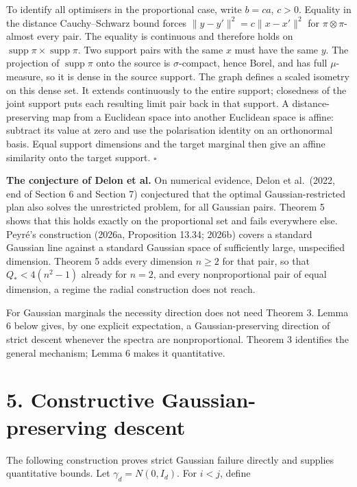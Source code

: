 \documentclass[
  british,
  11pt,
  a4paper,
]{article}
\begin{document}
To identify all optimisers in the proportional case, write \(b=c a\),
\(c>0\). Equality in the distance Cauchy--Schwarz bound forces
\(\|y-y'\|^2=c\|x-x'\|^2\) for \(\pi\otimes\pi\)-almost every pair. The
equality is continuous and therefore holds on
\(\operatorname{supp}\pi\times\operatorname{supp}\pi\). Two support
pairs with the same \(x\) must have the same \(y\). The projection of
\(\operatorname{supp}\pi\) onto the source is \(\sigma\)-compact, hence
Borel, and has full \(\mu\)-measure, so it is dense in the source
support. The graph defines a scaled isometry on this dense set. It
extends continuously to the entire support; closedness of the joint
support puts each resulting limit pair back in that support. A
distance-preserving map from a Euclidean space into another Euclidean
space is affine: subtract its value at zero and use the polarisation
identity on an orthonormal basis. Equal support dimensions and the
target marginal then give an affine similarity onto the target support.
\(\square\)

\textbf{The conjecture of Delon et al.} On numerical evidence, Delon et
al.~(2022, end of Section 6 and Section 7) conjectured that the optimal
Gaussian-restricted plan also solves the unrestricted problem, for all
Gaussian pairs. Theorem 5 shows that this holds exactly on the
proportional set and fails everywhere else. Peyré's construction (2026a,
Proposition 13.34; 2026b) covers a standard Gaussian line against a
standard Gaussian space of sufficiently large, unspecified dimension.
Theorem 5 adds every dimension \(n\geq2\) for that pair, so that
\(Q_*<4(n^2-1)\) already for \(n=2\), and every nonproportional pair of
equal dimension, a regime the radial construction does not reach.

For Gaussian marginals the necessity direction does not need Theorem 3.
Lemma 6 below gives, by one explicit expectation, a Gaussian-preserving
direction of strict descent whenever the spectra are nonproportional.
Theorem 3 identifies the general mechanism; Lemma 6 makes it
quantitative.

\section{5. Constructive Gaussian-preserving
descent}\label{constructive-gaussian-preserving-descent}

The following construction proves strict Gaussian failure directly and
supplies quantitative bounds. Let \(\gamma_d=N(0,I_d)\). For \(i<j\),
define
\end{document}
